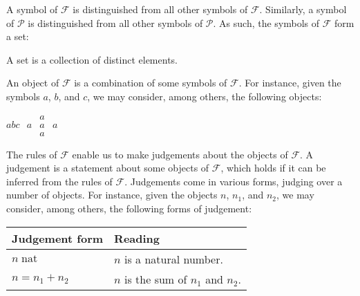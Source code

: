 A symbol of $\mathcal{F}$ is distinguished from all other symbols of
$\mathcal{F}$. Similarly, a symbol of $\mathcal{P}$ is distinguished from all
other symbols of $\mathcal{P}$. As such, the symbols of $\mathcal{F}$ form a
set:

\begin{definition}

A set is a collection of distinct elements.

\end{definition}

An object of $\mathcal{F}$ is a combination of some symbols of
$\mathcal{F}$. For instance, given the symbols $a$, $b$, and $c$, we may
consider, among others, the following objects:

\begin{center}
$abc$
\quad\quad\quad
$\begin{matrix}
  & a &   \\
a & a & a \\
  & a &
\end{matrix}$
\quad\quad\quad
{}

\end{center}

The rules of $\mathcal{F}$ enable us to make judgements about the objects of
$\mathcal{F}$. A judgement is a statement about some objects of $\mathcal{F}$,
which holds if it can be inferred from the rules of $\mathcal{F}$.  Judgements
come in various forms, judging over a number of objects. For instance, given
the objects $n$, $n_1$, and $n_2$, we may consider, among others, the following
forms of judgement:

\begin{table}[h]
\centering
\begin{tabular}{|l|l|}
\hline
\textbf{Judgement form} & \textbf{Reading} \\
\hline
$n\;\text{nat}$ & $n$ is a natural number. \\
\hline
$n=n_1+n_2$ & $n$ is the sum of $n_1$ and $n_2$.\\
\hline
\end{tabular}
\end{table}

